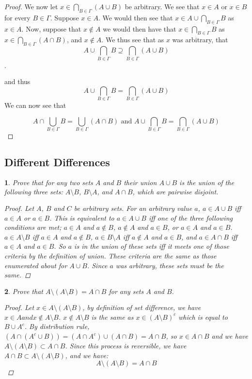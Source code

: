 \documentclass{book}
\newtheorem{minorEx}{}[section]
\begin{document}
\begin{proof}
    We now let $x \in \bigcap_{B\in \Gamma} (A \cup B)$ be arbitrary. 
    We see that $x \in A$ or $x \in B$ for every $B \in \Gamma$. 
    Suppose $x \in A$. We would then see that $x \in A \cup \bigcap_{B\in\Gamma} B$ as $x \in A$. 
    Now, suppose that $x \notin A$ we would then have that $x \in \bigcap_{B\in\Gamma} B$ as $x \in \bigcap_{B\in\Gamma} (A \cap B)$, and $x \notin A$. We thus see that as $x$ was arbitrary, that $$A \cup \bigcap_{B\in \Gamma} B \supseteq \bigcap_{B\in \Gamma} (A \cup B)$$.
    
    and thus 
    $$A \cup \bigcap_{B\in \Gamma} B = \bigcap_{B\in \Gamma} (A \cup B)$$
    We can now see that
    
    $$A \cap  \bigcup_{B\in \Gamma} B = \bigcup_{B\in \Gamma} (A \cap B)\text{  and  } A \cup \bigcap_{B\in \Gamma} B = \bigcap_{B\in \Gamma} (A \cup B)$$
    
\end{proof}
\subsection{Different Differences}%
			\begin{minorEx}%
            Prove that for any two sets $A$ and $B$ their union $A \cup B$ is the union of the following three sets: $A \setminus B$, $B \setminus A$, and $A \cap B$, which are pairwise disjoint.
            \begin{proof}Let $A$, $B$ and $C$ be arbitrary sets. For an arbitrary value $a$, $a \in A \cup B$ iff $a \in A$ or $a \in B$. This is equivalent to $a \in A \cup B$ iff one of the three following conditions are met; $a \in A$ and $a \not \in B$, $a \not \in A$ and $a \in B$, or $a \in A$ and $a \in B$. \newline $a \in A \setminus B$ iff $a \in A$ and $a \not \in B$, $a \in B \setminus A$ iff $a \not \in A$ and $a \in B$, and $a \in A \cap B$ iff $a \in A$ and $a \in B$. So $a$ is in the union of these sets iff it meets one of those criteria by the definition of union. These criteria are the same as those enumerated about for $A \cup B$. Since $a$ was arbitrary, these sets must be the same.
            
            \end{proof}
            \end{minorEx}
            \begin{minorEx} %
            Prove that $A \setminus (A \setminus B) = A \cap B$ for any sets $A$ and $B$.
            \begin{proof}
            Let $x \in A \setminus (A \setminus B)$, by definition of set difference, we have $x \in A and x \not\in A \setminus B$. $x \not\in A \setminus B$ is the same as $x \in  (A \setminus B)^c$ which is equal to $B \cup A^c$. By distribution rule, $(A \cap (A^c \cup B)) = (A \cap A^c) \cup (A \cap B) = A \cap B$, so $x \in A \cap B$ and we have $A \setminus (A \setminus B) \subset A \cap B$. Since this process is reversible, we have $A \cap B  \subset A \setminus (A \setminus B)$, and we have: $$A \setminus (A \setminus B) = A \cap B$$
            \end{proof}
            \end{minorEx}
\end{document}
